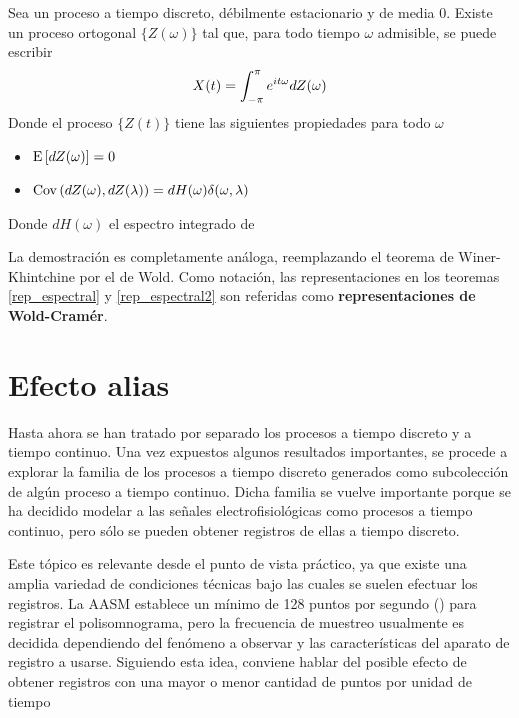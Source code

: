 \begin{teorema}
Sea \xt un proceso a tiempo discreto, débilmente estacionario y de media 0. Existe un proceso ortogonal $\{Z(\omega)\}$ tal que, para todo tiempo $\omega$ admisible, se puede escribir
\begin{equation*}
X(t) = \int_{-\pi}^{\pi} e^{i t \omega} dZ(\omega)
\end{equation*}
Donde el proceso $\{Z(t)\}$ tiene las siguientes propiedades para todo $\omega$
\begin{itemize}
\item $\mathrm{E}\left[ dZ(\omega) \right] = 0$
\item $\mathrm{Cov}\left( dZ(\omega),dZ(\lambda) \right) = dH(\omega) \delta(\omega, \lambda)$
\end{itemize}
Donde $dH(\omega)$ el espectro integrado de \xt
\label{rep_espectral2}
\end{teorema}

La demostración es completamente análoga, reemplazando el teorema de Winer-Khintchine por el de Wold. Como notación, las representaciones en los teoremas \ref{rep_espectral} y \ref{rep_espectral2} son referidas como \textbf{representaciones de Wold-Cramér}.


\section{Efecto {alias}}

Hasta ahora se han tratado por separado los procesos a tiempo discreto y a tiempo continuo. 
%
Una vez expuestos algunos resultados importantes, se procede a explorar la familia de los procesos a tiempo discreto generados como subcolección de algún proceso a tiempo continuo. 
%
Dicha familia se vuelve importante porque se ha decidido modelar a las señales electrofisiológicas como procesos a tiempo continuo, pero sólo se pueden obtener registros de ellas a tiempo discreto.

Este tópico es relevante desde el punto de vista práctico, ya que existe una amplia variedad de condiciones técnicas bajo las cuales se suelen efectuar los registros. La AASM establece un mínimo de 128 puntos por segundo (\hz) para registrar el polisomnograma, pero la frecuencia de muestreo usualmente es decidida dependiendo del fenómeno a observar y las características del aparato de registro a usarse.
%
Siguiendo esta idea, conviene hablar del posible efecto de obtener registros con una mayor o menor cantidad de puntos por unidad de tiempo

